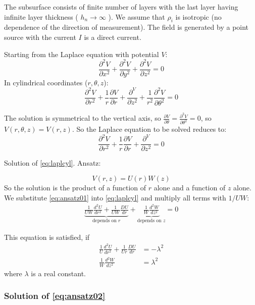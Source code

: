The subsurface consists of finite number of layers with the last layer having infinite layer thickness ( $h_n\rightarrow\infty$ ). We assume that $\rho_i$ is isotropic (no dependence of the direction of measurement). The field is generated by a point source with the current $I$ is a direct current.

Starting from the Laplace equation with potential $V$:
\begin{equation}
\frac{\partial^2 V}{\partial x^2}+\frac{\partial^2 V}{\partial y^2}+\frac{\partial^2 V}{\partial z^2}=0
\end{equation}
In cylindrical coordinates ($r,\theta,z$):
\begin{equation}
\frac{\partial^2 V}{\partial r^2}+\frac{1}{r}\frac{\partial V}{\partial r}+\frac{\partial^ V}{\partial z^2}+\frac{1}{r^2}\frac{\partial^2 V}{\partial\theta^2}=0
\end{equation}

The solution is symmetrical to the vertical axis, so $\frac{\partial V}{\partial \theta}=\frac{\partial^2 V}{\partial\theta^2}=0$, so $V(r,\theta,z)=V(r,z)$. So the Laplace equation to be solved reduces to:
\begin{equation}
\frac{\partial^2 V}{\partial r^2}+\frac{1}{r}\frac{\partial V}{\partial r}+\frac{\partial^ V}{\partial z^2}=0
\label{eq:laplcyl}
\end{equation}

Solution of \eqref{eq:laplcyl}. Ansatz:

\begin{equation}
V(r,z)=U(r)W(z) \label{eq:ansatz01}
\end{equation}
So the solution is the product of a function of $r$ alone and a function of $z$ alone. We substitute \eqref{eq:ansatz01} into \eqref{eq:laplcyl} and multiply all terms with $1/UW$:
\begin{align}
\underbrace{\frac{1}{UW}\frac{d^2 U}{dr^2}+\frac{1}{UW}\frac{DU}{dr}}_{\textrm{depends on } r}+\underbrace{\frac{1}{W}\frac{d^2 W}{dz^2}}_{\textrm{depends on } z}=0
\end{align}

This equation is satisfied, if
\begin{align}
\label{eq:ansatz03}
\frac{1}{U}\frac{d^2 U}{dr^2}+\frac{1}{Ur}\frac{DU}{dr}&=-\lambda^2\\ 
\frac{1}{W}\frac{d^2W}{dz^2}&=\lambda^2\label{eq:ansatz02}
\end{align}
where $\lambda$ is a real constant.

\subsubsection*{Solution of \eqref{eq:ansatz02}}

